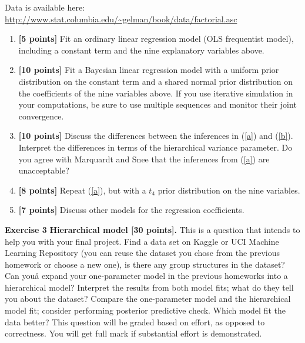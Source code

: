 \documentclass[11pt,notitlepage]{article}
\newcommand{\MBlue}[1]{{\color{MBlue}#1}}
\begin{document}
    Data is available here: \url{http://www.stat.columbia.edu/~gelman/book/data/factorial.asc}
    \begin{enumerate}
        \item \textbf{[5 points]} Fit an ordinary linear regression model (OLS frequentist model), including a constant term and the nine explanatory
        variables above.\label{a}
        \item \textbf{[10 points]} Fit a Bayesian linear regression model with a uniform prior distribution on the
        constant term and a shared normal prior distribution on the coefficients of the nine
        variables above. If you use iterative simulation in your computations, be sure to use
        multiple sequences and monitor their joint convergence.\label{b}
        \item \textbf{[10 points]} Discuss the differences between the inferences in (\ref{a}) and (\ref{b}). Interpret the differences in terms of the hierarchical variance parameter. Do you agree with Marquardt and
        Snee that the inferences from (\ref{a}) are unacceptable?
        \item \textbf{[8 points]} Repeat (\ref{a}), but with a $t_4$ prior distribution on the nine variables.
        \item \textbf{[7 points]} Discuss other models for the regression coefficients.
    \end{enumerate}
    \begin{exercise}[Solution]
    
    \end{exercise}
    

    \newpage
    \noindent
    \textbf{\large \MBlue{Exercise 3}}
    \vskip10pt
    \noindent
    \textbf{Hierarchical model [30 points].} This is a question that intends to help you with your final project. Find a data set on Kaggle or UCI  Machine Learning Repository (you can reuse the dataset you chose from the previous homework or choose a new one), is there any group structures in the dataset? Can youå expand your one-parameter model in the previous homeworks into a hierarchical model? Interpret the results from both model fits; what do they tell you about the dataset?
    \vskip10pt\noindent
    Compare the one-parameter model and the hierarchical model fit; consider performing posterior predictive check. Which model fit the data better?
    \vskip10pt\noindent
    This question will be graded based on effort, as opposed to correctness. You will get full mark if substantial effort is demonstrated.
    \begin{exercise}[Solution]
    
    \end{exercise}
    
\end{document}
